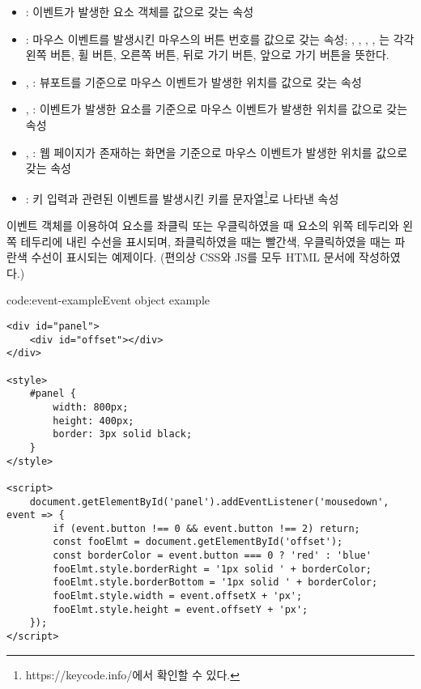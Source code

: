 \begin{itemize}
    \item {}: 이벤트가 발생한 요소 객체를 값으로 갖는 속성
    \item {}: 마우스 이벤트를 발생시킨 마우스의 버튼 번호를 값으로 갖는 속성; , , , , 는 각각 왼쪽 버튼, 휠 버튼, 오른쪽 버튼, 뒤로 가기 버튼, 앞으로 가기 버튼을 뜻한다.
    \item {}, : 뷰포트를 기준으로 마우스 이벤트가 발생한 위치를 값으로 갖는 속성
    \item {}, : 이벤트가 발생한 요소를 기준으로 마우스 이벤트가 발생한 위치를 값으로 갖는 속성
    \item {}, : 웹 페이지가 존재하는 화면을 기준으로 마우스 이벤트가 발생한 위치를 값으로 갖는 속성
    \item {}: 키 입력과 관련된 이벤트를 발생시킨 키를 문자열\footnote{https://keycode.info/에서 확인할 수 있다.}로 나타낸 속성
\end{itemize}

\은 이벤트 객체를 이용하여  요소를 좌클릭 또는 우클릭하였을 때  요소의 위쪽 테두리와 왼쪽 테두리에 내린 수선을 표시되며, 좌클릭하였을 때는 빨간색, 우클릭하였을 때는 파란색 수선이 표시되는 예제이다. (편의상 CSS와 JS를 모두 HTML 문서에 작성하였다.)

\begin{codeenv}{code:event-example}{Event object example}\begin{verbatim}
<div id="panel">
    <div id="offset"></div>
</div>

<style>
    #panel {
        width: 800px;
        height: 400px;
        border: 3px solid black;
    }
</style>

<script>
    document.getElementById('panel').addEventListener('mousedown', event => {
        if (event.button !== 0 && event.button !== 2) return;
        const fooElmt = document.getElementById('offset');
        const borderColor = event.button === 0 ? 'red' : 'blue'
        fooElmt.style.borderRight = '1px solid ' + borderColor;
        fooElmt.style.borderBottom = '1px solid ' + borderColor;
        fooElmt.style.width = event.offsetX + 'px';
        fooElmt.style.height = event.offsetY + 'px';
    });
</script>
\end{verbatim}
\end{codeenv}

